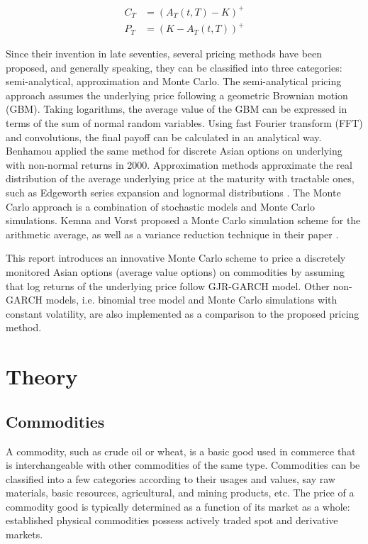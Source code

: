 \documentclass[10pt, a4paper, twocolumn]{article} %
\begin{document}
\begin{equation} \label{eq:1}
\begin{aligned}
C_T &= (A_T(t,T) - K)^+
\\
P_T &= (K - A_T(t,T))^+
\end{aligned}
\end{equation}

Since their invention in late seventies, several pricing methods have been proposed, and generally speaking, they can be classified into three categories: semi-analytical, approximation and Monte Carlo. The semi-analytical pricing approach assumes the underlying price following a geometric Brownian motion (GBM). Taking logarithms, the average value of the GBM can be expressed in terms of the sum of normal random variables. Using fast Fourier transform (FFT) and convolutions, the final payoff can be calculated in an analytical way. \citep{carverhill1990average} Benhamou applied the same method for discrete Asian options on underlying with non-normal returns in 2000. \citep{benhamou2000fast} Approximation methods approximate the real distribution of the average underlying price at the maturity with tractable ones, such as Edgeworth series expansion \citep{turnbull1991quick} and lognormal distributions \citep{levy1992pricing}. The Monte Carlo approach is a combination of stochastic models and Monte Carlo simulations. Kemna and Vorst proposed a Monte Carlo simulation scheme for the arithmetic average, as well as a variance reduction technique in their paper \citep{kemna1990pricing}.

This report introduces an innovative Monte Carlo scheme to price a discretely monitored Asian options (average value options) on commodities by assuming that log returns of the underlying price follow GJR-GARCH model. Other non-GARCH models, i.e. binomial tree model and Monte Carlo simulations with constant volatility, are also implemented as a comparison to the proposed pricing method.

\section{Theory}

\subsection{Commodities}

A commodity, such as crude oil or wheat, is a basic good used in commerce that is interchangeable with other commodities of the same type. Commodities can be classified into a few categories according to their usages and values, say raw materials, basic resources, agricultural, and mining products, etc. The price of a commodity good is typically determined as a function of its market as a whole: established physical commodities possess actively traded spot and derivative markets.
\end{document}
